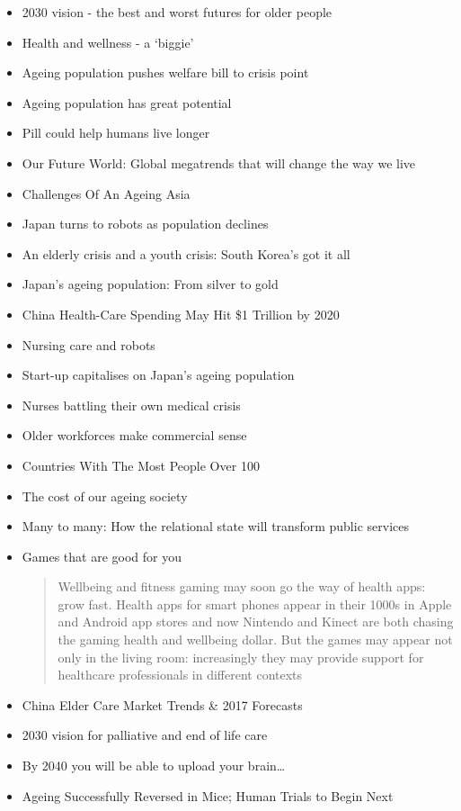 \begin{itemize}
	\item 2030 vision - the best and worst futures for older people
	\item Health and wellness - a `biggie'
	\item Ageing population pushes welfare bill to crisis point
	\item Ageing population has great potential
	\item Pill could help humans live longer
	\item Our Future World: Global megatrends that will change the way we live
	\item Challenges Of An Ageing Asia
	\item Japan turns to robots as population declines
	\item An elderly crisis and a youth crisis: South Korea's got it all
	\item Japan's ageing population: From silver to gold
	\item China Health-Care Spending May Hit \$1 Trillion by 2020
	\item Nursing care and robots
	\item Start-up capitalises on Japan's ageing population
	\item Nurses battling their own medical crisis
	\item Older workforces make commercial sense
	\item Countries With The Most People Over 100
	\item The cost of our ageing society
	\item Many to many: How the relational state will transform public services
	\item Games that are good for you
	\begin{quotation}
		Wellbeing and fitness gaming may soon go the way of health apps: grow fast. Health apps for smart phones appear in their 1000s in Apple and Android app stores and now Nintendo and Kinect are both chasing the gaming health and wellbeing dollar. But the games may appear not only in the living room: increasingly they may provide support for healthcare professionals in different contexts\end{quotation}
	\item China Elder Care Market Trends \& 2017 Forecasts
	\item 2030 vision for palliative and end of life care
	\item By 2040 you will be able to upload your brain\ldots
	\item Ageing Successfully Reversed in Mice; Human Trials to Begin Next

\end{itemize}
